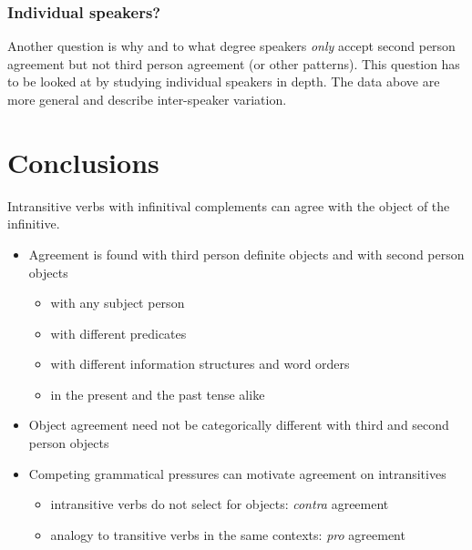 \subsubsection{Individual speakers?}

Another question is why and to what degree speakers \emph{only} accept second
person agreement but not third person agreement (or other patterns). This
question has to be looked at by studying individual speakers in depth. The data
above are more general and describe inter-speaker variation.

\section{Conclusions}\label{sec:conclusions}

Intransitive verbs with infinitival complements can agree with the object of
the infinitive.

\begin{itemize}

    \item   Agreement is found with third person definite objects and
        with second person objects

    \begin{itemize}

        \item 	with any subject person

        \item   with different predicates

        \item   with different information structures and word orders

        \item 	in the present and the past tense alike

    \end{itemize}

    \item[\ding{224}]   Object agreement need not be categorically different
        with third and second person objects

    \item   Competing grammatical pressures can motivate agreement on
        intransitives

    \begin{itemize}

        \item 	intransitive verbs do not select for objects: \emph{contra} agreement

        \item 	analogy to transitive verbs in the same contexts: \emph{pro} agreement

    \end{itemize}

\end{itemize}


